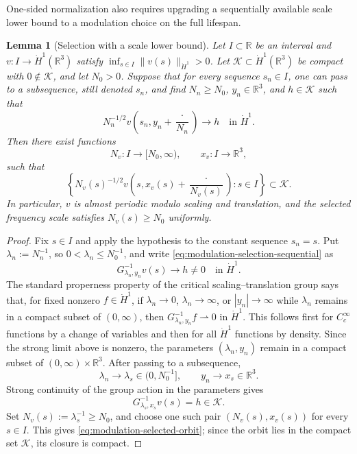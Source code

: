 \documentclass{interact}
\numberwithin{equation}{section}
\theoremstyle{plain}
\newtheorem{lemma}[theorem]{Lemma}
\theoremstyle{definition}
\theoremstyle{remark}
\newcommand{\R}{\mathbb R}
\begin{document}
One-sided normalization also requires upgrading a sequentially available scale lower bound to a modulation choice on the full lifespan.

\begin{lemma}[Selection with a scale lower bound]\label{lem:lower-bounded-modulation-selection}
Let $I\subset\R$ be an interval and $v:I\to\dot H^1(\R^3)$ satisfy $\inf_{s\in I}\|v(s)\|_{\dot H^1}>0$. Let $\mathcal K\subset\dot H^1(\R^3)$ be compact with $0\notin\mathcal K$, and let $N_0>0$. Suppose that for every sequence $s_n\in I$, one can pass to a subsequence, still denoted $s_n$, and find $N_n\ge N_0$, $y_n\in\R^3$, and $h\in\mathcal K$ such that
\begin{equation}\label{eq:modulation-selection-sequential}
 N_n^{-1/2}v\left(s_n,y_n+\frac{\cdot}{N_n}\right)
 \longrightarrow h
 \quad\text{in }\dot H^1.
\end{equation}
Then there exist functions
\[
 N_v:I\to[N_0,\infty),
 \qquad
 x_v:I\to\R^3,
\]
such that
\begin{equation}\label{eq:modulation-selected-orbit}
 \left\{
 N_v(s)^{-1/2}v\left(s,x_v(s)+\frac{\cdot}{N_v(s)}\right):s\in I
 \right\}
 \subset\mathcal K.
\end{equation}
In particular, $v$ is almost periodic modulo scaling and translation, and the selected frequency scale satisfies $N_v(s)\ge N_0$ uniformly.
\end{lemma}

\begin{proof}
Fix $s\in I$ and apply the hypothesis to the constant sequence $s_n=s$. Put $\lambda_n:=N_n^{-1}$, so $0<\lambda_n\le N_0^{-1}$, and write \eqref{eq:modulation-selection-sequential} as
\[
 G_{\lambda_n,y_n}^{-1}v(s)\longrightarrow h\ne0
 \quad\text{in }\dot H^1.
\]
The standard properness property of the critical scaling--translation group says that, for fixed nonzero $f\in\dot H^1$, if $\lambda_n\to0$, $\lambda_n\to\infty$, or $|y_n|\to\infty$ while $\lambda_n$ remains in a compact subset of $(0,\infty)$, then $G_{\lambda_n,y_n}^{-1}f\rightharpoonup0$ in $\dot H^1$. This follows first for $C_c^\infty$ functions by a change of variables and then for all $\dot H^1$ functions by density. Since the strong limit above is nonzero, the parameters $(\lambda_n,y_n)$ remain in a compact subset of $(0,\infty)\times\R^3$. After passing to a subsequence,
\[
 \lambda_n\to\lambda_s\in(0,N_0^{-1}],
 \qquad
 y_n\to x_s\in\R^3.
\]
Strong continuity of the group action in the parameters gives
\[
 G_{\lambda_s,x_s}^{-1}v(s)=h\in\mathcal K.
\]
Set $N_v(s):=\lambda_s^{-1}\ge N_0$, and choose one such pair $(N_v(s),x_v(s))$ for every $s\in I$. This gives \eqref{eq:modulation-selected-orbit}; since the orbit lies in the compact set $\mathcal K$, its closure is compact.
\end{proof}
\end{document}

